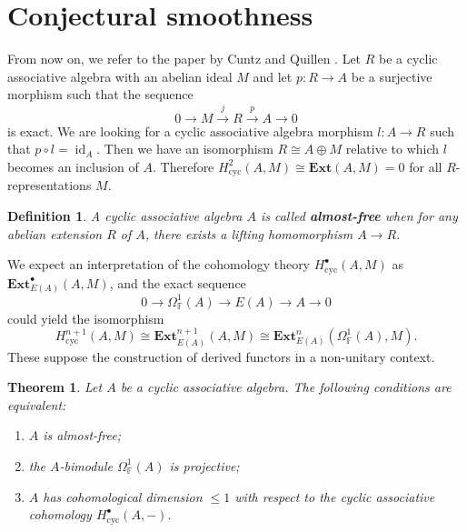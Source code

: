 \documentclass[pdflatex,sn-mathphys-num]{sn-jnl}%
\theoremstyle{thmstyleone}%
\newtheorem{theorem}{Theorem}%
\newtheorem{definition}{Definition}[section]
\theoremstyle{thmstyletwo}%
\theoremstyle{thmstylethree}%
\begin{document}
\section{Conjectural smoothness}

From now on, we refer to the paper by Cuntz and Quillen \cite{CuntzQuillen}. Let $R$ be a cyclic associative algebra with an abelian ideal $M$ and let $p: R \to A$ be a surjective morphism such that the sequence
\[
0 \longrightarrow M \xrightarrow{j} R \xrightarrow{p} A \longrightarrow 0
\]
is exact. We are looking for a cyclic associative algebra morphism $l: A \to R$ such that $p \circ l = \operatorname{id}_A$. Then we have an isomorphism $R \cong A \oplus M$ relative to which $l$ becomes an inclusion of $A$. Therefore $H^2_{\mathrm{cyc}}(A, M) \cong \mathbf{Ext}(A, M) = 0$ for all $R$-representations $M$.

\begin{definition}\label{def:almost_free}
A cyclic associative algebra $A$ is called \textbf{almost-free} when for any abelian extension $R$ of $A$, there exists a lifting homomorphism $A \to R$.
\end{definition}

We expect an interpretation of the cohomology theory $H^\bullet_{\mathrm{cyc}}(A, M)$ as $\mathbf{Ext}_{E(A)}^\bullet(A, M)$, and the exact sequence
\[
0 \longrightarrow \Omega^1_{\mathbb{F}}(A) \longrightarrow E(A) \longrightarrow A \longrightarrow 0
\]
could yield the isomorphism
\[
H^{n+1}_{\mathrm{cyc}}(A, M) \cong \mathbf{Ext}_{E(A)}^{n+1}(A, M) \cong \mathbf{Ext}_{E(A)}^n(\Omega^1_{\mathbb{F}}(A), M).
\]
These suppose the construction of derived functors in a non-unitary context.

\begin{theorem}\label{thm:almost_free_equivalent}
Let $A$ be a cyclic associative algebra. The following conditions are equivalent:
\begin{enumerate}
\item[(1)] $A$ is almost-free;
\item[(2)] the $A$-bimodule $\Omega^1_{\mathbb{F}}(A)$ is projective;
\item[(3)] $A$ has cohomological dimension $\le 1$ with respect to the cyclic associative cohomology $H^\bullet_{\mathrm{cyc}}(A, -)$.
\end{enumerate}
\end{theorem}
\end{document}
